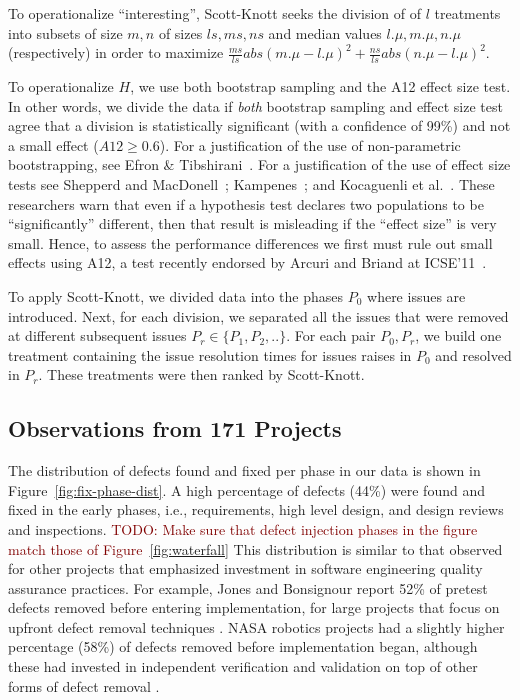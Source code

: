 \documentclass[smallcondensed]{svjour3}
\newcommand{\todo}[1]{\textcolor{Maroon}{TODO: #1}}
\newcommand{\fig}[1]{Figure~\ref{fig:#1}}
\begin{document}
    To operationalize ``interesting'', Scott-Knott seeks the division of 
    of $l$ treatments into subsets of size $m,n$ of sizes $ls,ms,ns$ and median values
    $l.\mu, m.\mu, n.\mu$ (respectively) in order to maximize
 $\frac{ms}{ls}abs(m.\mu - l.\mu)^2 + \frac{ns}{ls}abs(n.\mu - l.\mu)^2$.
   
   To operationalize $H$, we use both  bootstrap sampling  and the A12 effect size test.
   In other 
    words, we divide the data if \textit{both} bootstrap sampling and effect 
    size test agree that a division is statistically significant (with a 
    confidence of 99\%) and not a small effect ($A12 \ge 0.6$).
    For a justification of the use of non-parametric bootstrapping, see Efron 
    \& Tibshirani~\cite[p220-223]{efron93}. For a justification of the use of 
    effect size tests see Shepperd and MacDonell~\cite{shepperd12a}; 
    Kampenes~\cite{kampenes07}; and Kocaguenli et 
    al.~\cite{Kocaguneli2013:ep}. These researchers warn that even if a 
    hypothesis test declares two populations to be ``significantly'' 
    different, then that result is misleading if the ``effect size'' is very 
    small. Hence, to assess the performance differences we first must rule out 
    small effects using A12, a test   recently endorsed by Arcuri and 
    Briand at ICSE'11~\cite{arcuri11}.
  
    
    To  apply Scott-Knott, we divided data into the phases $P_0$ where issues are introduced. Next, for each division, we separated all the issues that were removed at different subsequent issues $P_r \in \{P_1,P_2,..\}$.
    For each pair $P_0,P_r$, we build one treatment containing the  issue resolution times for     issues raises in $P_0$ and resolved in $P_r$. These treatments
    were then ranked by Scott-Knott. 
     
   
    


 
 
 
\subsection{Observations from 171 Projects}\label{tion:171projects}

The distribution of defects found and fixed per phase in our data is shown in Figure~\ref{fig:fix-phase-dist}. 
A high percentage of defects (44\%) were found and fixed in the early phases, i.e., requirements, high level design, and design reviews and inspections. \todo{Make sure that defect injection phases in the figure match those of \fig{waterfall}} This distribution is similar to that observed for other projects that emphasized investment in software engineering quality assurance practices. For example, Jones and Bonsignour report 52\% of pretest defects removed before entering implementation, for large projects that focus on upfront defect removal techniques \cite{jones12}. NASA robotics projects had a slightly higher percentage (58\%) of defects removed before implementation began, although these had invested in independent verification and validation on top of other forms of defect removal \cite{me08a}.  
\end{document}
